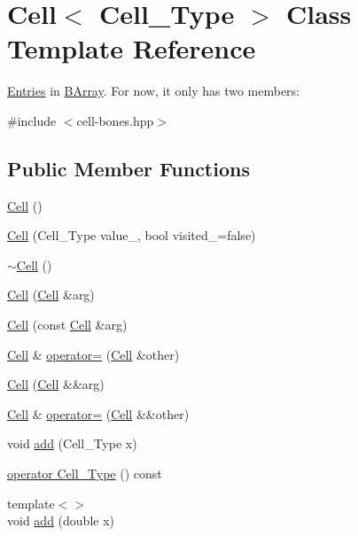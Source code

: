 \hypertarget{class_cell}{}\section{Cell$<$ Cell\+\_\+\+Type $>$ Class Template Reference}
\label{class_cell}


\hyperlink{class_entries}{Entries} in \hyperlink{class_b_array}{B\+Array}. For now, it only has two members\+:  




{\ttfamily \#include $<$cell-\/bones.\+hpp$>$}

\subsection*{Public Member Functions}
\begin{DoxyCompactItemize}
\item 
\hyperlink{class_cell_a402912c21a4c87659c0576a4bfa3c48f}{Cell} ()
\item 
\hyperlink{class_cell_a6592b5fcfc80001c8de64a2e722ca715}{Cell} (Cell\+\_\+\+Type value\+\_\+, bool visited\+\_\+=false)
\item 
\hyperlink{class_cell_a12667d768c7eab9e295b3476a5d60c0e}{$\sim$\+Cell} ()
\item 
\hyperlink{class_cell_ac116d4235eadb134018324455a9bbdbf}{Cell} (\hyperlink{class_cell}{Cell} \&arg)
\item 
\hyperlink{class_cell_ab745c6f11e7f43f06318b4bb733d9474}{Cell} (const \hyperlink{class_cell}{Cell} \&arg)
\item 
\hyperlink{class_cell}{Cell} \& \hyperlink{class_cell_acf4bbf136ed394887c35cfd4e78f50b9}{operator=} (\hyperlink{class_cell}{Cell} \&other)
\item 
\hyperlink{class_cell_abe27b0c411864d9fce33a1cffe918169}{Cell} (\hyperlink{class_cell}{Cell} \&\&arg)
\item 
\hyperlink{class_cell}{Cell} \& \hyperlink{class_cell_a9bb18ace78fd9010b461c853ccc2c0f7}{operator=} (\hyperlink{class_cell}{Cell} \&\&other)
\item 
void \hyperlink{class_cell_a3d063afd2a8743623d0e524debbd55e9}{add} (Cell\+\_\+\+Type x)
\item 
\hyperlink{class_cell_abe9b289bc80d4f5d0717ba9e69197c0b}{operator Cell\+\_\+\+Type} () const
\item 
{\footnotesize template$<$$>$ }\\void \hyperlink{class_cell_a64d4b92f322ccb8cfbad53f816d2caf8}{add} (double x)

\end{DoxyCompactItemize}
